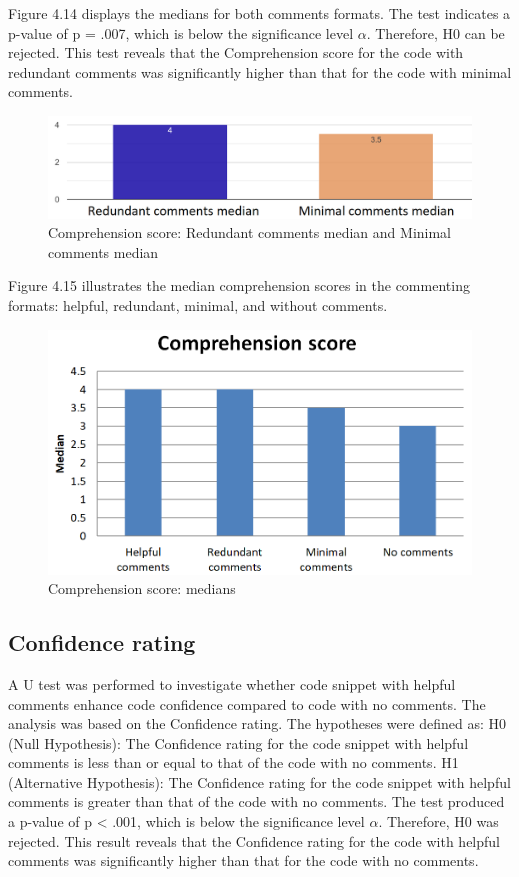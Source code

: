 Figure 4.14 displays the medians for both comments formats.
The test indicates a p-value of p = .007, which is below the significance level $\alpha $. Therefore, H0 can be rejected.  This test reveals that the Comprehension score for the code with redundant comments was significantly higher than that for the code with minimal comments. 

\begin{figure} [H]
  \centering
  \includegraphics[scale=0.56]{figures/red-min-q3.png}
  \caption{Comprehension score:  Redundant comments median and Minimal comments median}
  \label{fig:AnhangsChor}
\end{figure}


Figure 4.15 illustrates the median comprehension scores in the commenting formats: helpful, redundant, minimal, and without comments.

\begin{figure} [H]
  \centering
  \includegraphics[scale=0.8]{figures/comMed.png}
  \caption{Comprehension score: medians}
  \label{fig:AnhangsChor}
\end{figure}



\subsection{Confidence rating}
A U test was performed to investigate whether code snippet with helpful comments enhance code confidence compared to code with no comments. The analysis was based on the Confidence rating. The hypotheses were defined as:  H0 (Null Hypothesis): The Confidence rating for the code snippet with helpful comments is less than or equal to that of the code with no comments.  H1 (Alternative Hypothesis): The Confidence rating for the code snippet with helpful comments is greater than that of the code with no comments. The test produced a p-value of   p < .001, which is below the significance level $\alpha$. Therefore, H0 was rejected.  This result reveals that the Confidence rating  for the code with helpful comments was significantly higher than that for the code with no comments. 




